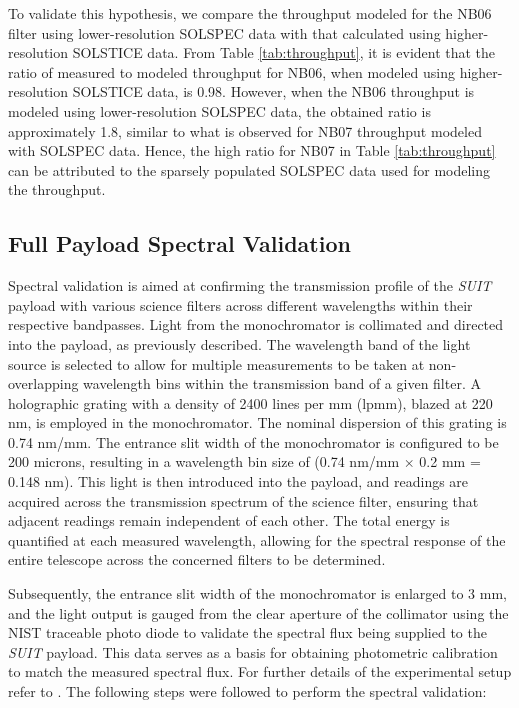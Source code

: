 To validate this hypothesis, we compare the throughput modeled for the NB06 filter using lower-resolution SOLSPEC data with that calculated using higher-resolution SOLSTICE data. From Table \ref{tab:throughput}, it is evident that the ratio of measured to modeled throughput for NB06, when modeled using higher-resolution SOLSTICE data, is 0.98. However, when the NB06 throughput is modeled using lower-resolution SOLSPEC data, the obtained ratio is approximately 1.8, similar to what is observed for NB07 throughput modeled with SOLSPEC data. Hence, the high ratio for NB07 in Table \ref{tab:throughput} can be attributed to the sparsely populated SOLSPEC data used for modeling the throughput.

\subsection{Full Payload Spectral Validation}\label{valid}

Spectral validation is aimed at confirming the transmission profile of the \textit{SUIT} payload with various science filters across different wavelengths within their respective bandpasses. Light from the monochromator is collimated and directed into the payload, as previously described. The wavelength band of the light source is selected to allow for multiple measurements to be taken at non-overlapping wavelength bins within the transmission band of a given filter. A holographic grating with a density of 2400 lines per mm (lpmm), blazed at 220 nm, is employed in the monochromator. The nominal dispersion of this grating is 0.74 nm/mm. The entrance slit width of the monochromator is configured to be 200 microns, resulting in a wavelength bin size of (0.74 nm/mm $\times$ 0.2 mm = 0.148 nm). This light is then introduced into the payload, and readings are acquired across the transmission spectrum of the science filter, ensuring that adjacent readings remain independent of each other. The total energy is quantified at each measured wavelength, allowing for the spectral response of the entire telescope across the concerned filters to be determined.

Subsequently, the entrance slit width of the monochromator is enlarged to 3 mm, and the light output is gauged from the clear aperture of the collimator using the NIST traceable photo diode to validate the spectral flux being supplied to the \textit{SUIT} payload. This data serves as a basis for obtaining photometric calibration to match the measured spectral flux. For further details of the experimental setup refer to \cite{sarkar24}. The following steps were followed to perform the spectral validation:

